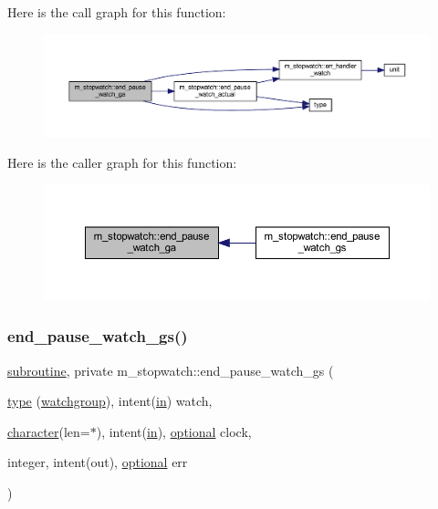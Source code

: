 Here is the call graph for this function\+:
\nopagebreak
\begin{figure}[H]
\begin{center}
\leavevmode
\includegraphics[width=350pt]{namespacem__stopwatch_a9b7a584834f64f147b50fafd7574ef61_cgraph}
\end{center}
\end{figure}
Here is the caller graph for this function\+:
\nopagebreak
\begin{figure}[H]
\begin{center}
\leavevmode
\includegraphics[width=350pt]{namespacem__stopwatch_a9b7a584834f64f147b50fafd7574ef61_icgraph}
\end{center}
\end{figure}
\mbox{\label{namespacem__stopwatch_a73243081be89522031b0767e9141663a}} 
\subsubsection{\texorpdfstring{end\+\_\+pause\+\_\+watch\+\_\+gs()}{end\_pause\_watch\_gs()}}
{\footnotesize\ttfamily \hyperlink{M__stopwatch_83_8txt_acfbcff50169d691ff02d4a123ed70482}{subroutine}, private m\+\_\+stopwatch\+::end\+\_\+pause\+\_\+watch\+\_\+gs (\begin{DoxyParamCaption}\item[{\hyperlink{stop__watch_83_8txt_a70f0ead91c32e25323c03265aa302c1c}{type} (\hyperlink{structm__stopwatch_1_1watchgroup}{watchgroup}), intent(\hyperlink{M__journal_83_8txt_afce72651d1eed785a2132bee863b2f38}{in})}]{watch,  }\item[{\hyperlink{option__stopwatch_83_8txt_abd4b21fbbd175834027b5224bfe97e66}{character}(len=$\ast$), intent(\hyperlink{M__journal_83_8txt_afce72651d1eed785a2132bee863b2f38}{in}), \hyperlink{option__stopwatch_83_8txt_aa4ece75e7acf58a4843f70fe18c3ade5}{optional}}]{clock,  }\item[{integer, intent(out), \hyperlink{option__stopwatch_83_8txt_aa4ece75e7acf58a4843f70fe18c3ade5}{optional}}]{err }\end{DoxyParamCaption})\hspace{0.3cm}{\ttfamily [private]}}



